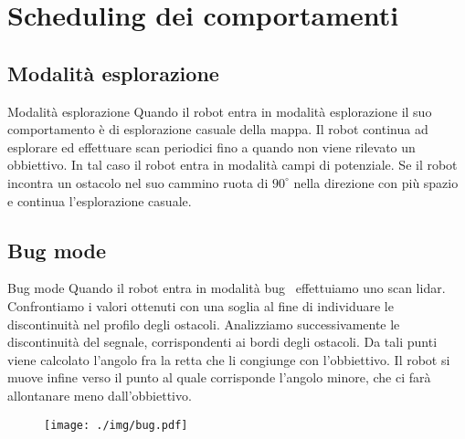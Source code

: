 \documentclass[10pt]{beamer}
\begin{document}
	\section{Scheduling dei comportamenti}\label{sec:Scheduling-dei-comportamenti}
	\frame{\sectionpage}
	\subsection{Modalità esplorazione}\label{subsec:Modalita-esplorazione}
	\begin{frame}{Modalità esplorazione}
	Quando il robot entra in modalità esplorazione il suo comportamento è di
	esplorazione casuale della mappa. Il robot continua ad esplorare ed
	effettuare scan periodici fino a quando non viene rilevato un obbiettivo.
	In tal caso il robot entra in modalità campi di potenziale. Se il robot
	incontra un ostacolo nel suo cammino ruota di $90^{\circ}$ nella direzione
	con più spazio e continua l'esplorazione casuale.
	\end{frame}
	
	\subsection{Bug mode}\label{subsec:Bug-mode}
	\begin{frame}{Bug mode}
	Quando il robot entra in modalità bug~\cite{503814} effettuiamo uno scan lidar. 
	Confrontiamo i valori ottenuti con una
	soglia al fine di individuare le discontinuità nel profilo degli ostacoli. 
	Analizziamo successivamente le discontinuità del segnale,
	corrispondenti ai bordi degli ostacoli.
	Da tali punti viene calcolato l'angolo fra la retta che li
	congiunge con l'obbiettivo. Il robot si muove infine verso il punto al
	quale corrisponde l'angolo minore, che ci farà allontanare meno
	dall'obbiettivo.
	
	\begin{figure}[H]
		\centering
		\texttt{[image: ./img/bug.pdf]}
		\label{fig:bug}
	\end{figure}

	\end{frame}
\end{document}
